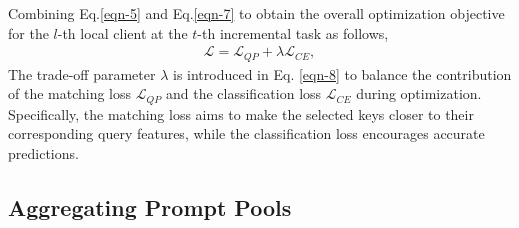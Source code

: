 \documentclass[sigconf,anonymous,review,screen]{acmart}
\begin{document}
Combining Eq.\eqref{eqn-5} and Eq.\eqref{eqn-7} to obtain the overall optimization objective for the $l$-th local client at the $t$-th incremental task as follows,
\begin{equation}\label{eqn-8}
	\begin{aligned}
		\mathcal{L} = \mathcal{L}_{QP} + \lambda \mathcal{L}_{CE},
	\end{aligned}
\end{equation}
The trade-off parameter $\lambda$ is introduced in Eq. \eqref{eqn-8} to balance the contribution of the matching loss $\mathcal{L}_{QP}$ and the classification loss $\mathcal{L}_{CE}$ during optimization. Specifically, the matching loss aims to make the selected keys closer to their corresponding query features, while the classification loss encourages accurate predictions.

\subsection{Aggregating Prompt Pools}\label{Aggregating Prompt Pools}
\end{document}
